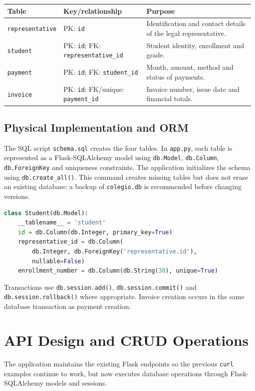 \documentclass[11pt,letterpaper]{article}
\begin{document}
\begin{center}
\begin{tabular}{p{2.7cm}p{3.2cm}p{6.8cm}}\toprule
Table & Key/relationship & Purpose\\\midrule
\texttt{representative} & PK: \texttt{id} & Identification and contact details of the legal representative.\\
\texttt{student} & PK: \texttt{id}; FK: \texttt{representative\_id} & Student identity, enrollment and grade.\\
\texttt{payment} & PK: \texttt{id}; FK: \texttt{student\_id} & Month, amount, method and status of payments.\\
\texttt{invoice} & PK: \texttt{id}; FK/unique: \texttt{payment\_id} & Invoice number, issue date and financial totals.\\\bottomrule
\end{tabular}
\end{center}

\subsection{Physical Implementation and ORM}
The SQL script \texttt{schema.sql} creates the four tables. In \texttt{app.py}, each table is represented as a Flask-SQLAlchemy model using \texttt{db.Model}, \texttt{db.Column}, \texttt{db.ForeignKey} and uniqueness constraints. The application initializes the schema using \texttt{db.create\_all()}. This command creates missing tables but does not erase an existing database; a backup of \texttt{colegio.db} is recommended before changing versions.
\begin{lstlisting}[language=Python]
class Student(db.Model):
    __tablename__ = 'student'
    id = db.Column(db.Integer, primary_key=True)
    representative_id = db.Column(
        db.Integer, db.ForeignKey('representative.id'),
        nullable=False)
    enrollment_number = db.Column(db.String(30), unique=True)
\end{lstlisting}
Transactions use \texttt{db.session.add()}, \texttt{db.session.commit()} and \texttt{db.session.rollback()} where appropriate. Invoice creation occurs in the same database transaction as payment creation.

\section{API Design and CRUD Operations}
The application maintains the existing Flask endpoints so the previous \texttt{curl} examples continue to work, but now executes database operations through Flask-SQLAlchemy models and sessions.
\end{document}
